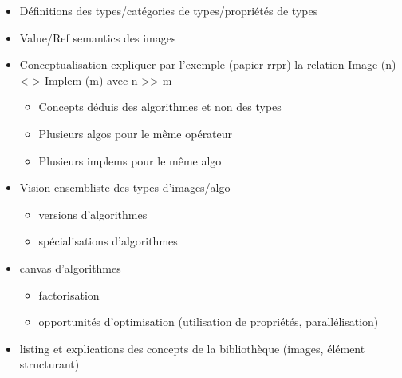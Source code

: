 
\begin{itemize}
  \item Définitions des types/catégories de types/propriétés de types
  \item Value/Ref semantics des images
  \item Conceptualisation expliquer par l'exemple (papier rrpr) la relation Image (n) <-> Implem (m) avec n >> m
    \begin{itemize}
      \item Concepts déduis des algorithmes et non des types
      \item Plusieurs algos pour le même opérateur
      \item Plusieurs implems pour le même algo
    \end{itemize}
  \item Vision ensembliste des types d'images/algo
    \begin{itemize}
      \item versions d'algorithmes
      \item spécialisations d'algorithmes
    \end{itemize}
  \item canvas d'algorithmes
    \begin{itemize}
      \item factorisation
      \item opportunités d'optimisation (utilisation de propriétés, parallélisation)
    \end{itemize}
  \item listing et explications des concepts de la bibliothèque (images, élément structurant)
\end{itemize}